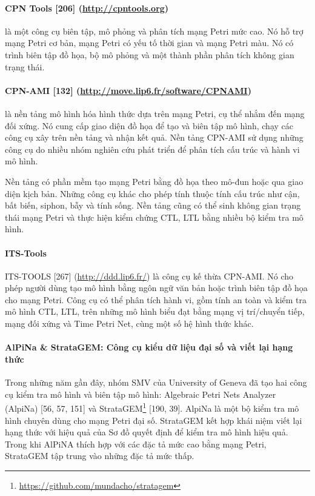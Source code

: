 \paragraph{CPN Tools [206] (\url{http://cpntools.org})}
là một công cụ biên tập, mô phỏng và phân tích mạng Petri mức cao. Nó hỗ trợ mạng Petri cơ bản, mạng Petri có yếu tố thời gian và mạng Petri màu. Nó có trình biên tập đồ họa, bộ mô phỏng và một thành phần phân tích không gian trạng thái.

\paragraph{CPN-AMI [132] (\url{http://move.lip6.fr/software/CPNAMI})}
là nền tảng mô hình hóa hình thức dựa trên mạng Petri, cụ thể nhắm đến mạng đối xứng. Nó cung cấp giao diện đồ họa để tạo và biên tập mô hình, chạy các công cụ xây trên nền tảng và nhận kết quả. Nền tảng CPN-AMI sử dụng những công cụ do nhiều nhóm nghiên cứu phát triển để phân tích cấu trúc và hành vi mô hình.

Nền tảng có phần mềm tạo mạng Petri bằng đồ họa theo mô-đun hoặc qua giao diện kịch bản. Những công cụ khác cho phép tính thuộc tính cấu trúc như cận, bất biến, siphon, bẫy và tính sống. Nền tảng cũng có thể sinh không gian trạng thái mạng Petri và thực hiện kiểm chứng CTL, LTL bằng nhiều bộ kiểm tra mô hình.

\paragraph{ITS-Tools}
ITS-TOOLS [267] (\url{http://ddd.lip6.fr/}) là công cụ kế thừa CPN-AMI. Nó cho phép người dùng tạo mô hình bằng ngôn ngữ văn bản hoặc trình biên tập đồ họa cho mạng Petri. Công cụ có thể phân tích hành vi, gồm tính an toàn và kiểm tra mô hình CTL, LTL, trên những mô hình biểu đạt bằng mạng vị trí/chuyển tiếp, mạng đối xứng và Time Petri Net, cùng một số hệ hình thức khác.

\paragraph{AlPiNa \& StrataGEM: Công cụ kiểu dữ liệu đại số và viết lại hạng thức}
Trong những năm gần đây, nhóm SMV của University of Geneva đã tạo hai công cụ kiểm tra mô hình và biên tập mô hình: Algebraic Petri Nets Analyzer (AlpiNa) [56, 57, 151] và StrataGEM\footnote{\url{https://github.com/mundacho/stratagem}} [190, 39]. AlpiNa là một bộ kiểm tra mô hình chuyên dùng cho mạng Petri đại số. StrataGEM kết hợp khái niệm viết lại hạng thức với hiệu quả của Sơ đồ quyết định để kiểm tra mô hình hiệu quả. Trong khi AlPiNA thích hợp với các đặc tả mức cao bằng mạng Petri, StrataGEM tập trung vào những đặc tả mức thấp.

